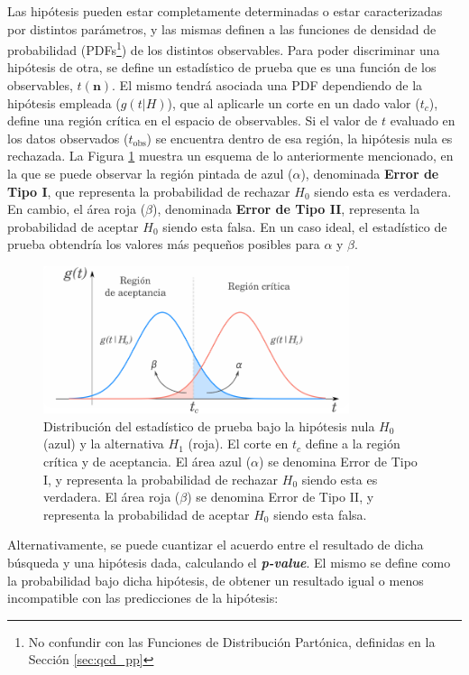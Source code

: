 Las hipótesis pueden estar completamente determinadas o estar caracterizadas por distintos parámetros, y las mismas definen a las funciones de densidad de probabilidad (PDFs\footnote{No confundir con las Funciones de Distribución Partónica, definidas en la Sección \ref{sec:qcd_pp}}) de los distintos observables. Para poder discriminar una hipótesis de otra, se define un estadístico de prueba que es una función de los observables, $t(\textbf{n})$. El mismo tendrá asociada una PDF dependiendo de la hipótesis empleada ($g(t|H)$), que al aplicarle un corte en un dado valor ($t_c$), define una región crítica en el espacio de observables. Si el valor de $t$ evaluado en los datos observados ($t_{\text{obs}}$) se encuentra dentro de esa región, la hipótesis nula es rechazada. La Figura \ref{fig:nullh} muestra un esquema de lo anteriormente mencionado, en la que se puede observar la región pintada de azul ($\alpha$), denominada \textbf{Error de Tipo I}, que representa la probabilidad de rechazar $H_0$ siendo esta es verdadera. En cambio, el área roja ($\beta$), denominada \textbf{Error de Tipo II}, representa la probabilidad de aceptar $H_0$ siendo esta falsa. En un caso ideal, el estadístico de prueba obtendría los valores más pequeños posibles para $\alpha$ y $\beta$.

\begin{figure}
  \centering
  \includegraphics[width=0.8\textwidth]{images/statistics/hypo_test.pdf}
  \caption{Distribución del estadístico de prueba bajo la hipótesis nula $H_0$ (azul) y la alternativa $H_1$ (roja). El corte en $t_c$ define a la región crítica y de aceptancia. El área azul ($\alpha$) se denomina Error de Tipo I, y representa la probabilidad de rechazar $H_0$ siendo esta es verdadera. El área roja ($\beta$) se denomina Error de Tipo II, y representa la probabilidad de aceptar $H_0$ siendo esta falsa.}
  \label{fig:nullh}
\end{figure}


Alternativamente, se puede cuantizar el acuerdo entre el resultado de dicha búsqueda y una hipótesis dada, calculando el \textbf{\textit{p-value}}. El mismo se define como la probabilidad bajo dicha hipótesis, de obtener un resultado igual o menos incompatible con las predicciones de la hipótesis:

